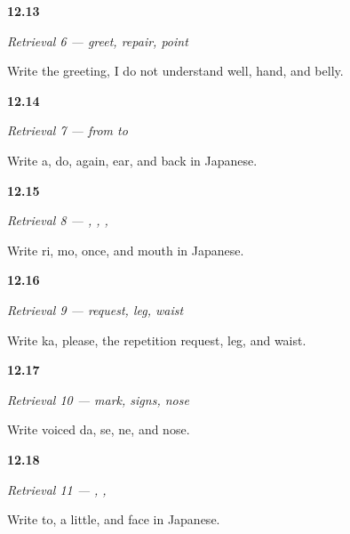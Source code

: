 \noindent\begin{minipage}[t]{\linewidth}
\raggedright
\hypertarget{review-JA-R12-repair-01-card}{\textbf{12.13}} \emph{Retrieval 6 — greet, repair, point}\par
\small Write the greeting, I do not understand well, hand, and belly.
\end{minipage}\par\medskip

\noindent\begin{minipage}[t]{\linewidth}
\raggedright
\hypertarget{review-JA-R12-repair-02-card}{\textbf{12.14}} \emph{Retrieval 7 — from  to }\par
\small Write a, do, again, ear, and back in Japanese.
\end{minipage}\par\medskip

\noindent\begin{minipage}[t]{\linewidth}
\raggedright
\hypertarget{review-JA-R12-repair-03-card}{\textbf{12.15}} \emph{Retrieval 8 — , , , }\par
\small Write ri, mo, once, and mouth in Japanese.
\end{minipage}\par\medskip

\noindent\begin{minipage}[t]{\linewidth}
\raggedright
\hypertarget{review-JA-R12-repair-04-card}{\textbf{12.16}} \emph{Retrieval 9 — request, leg, waist}\par
\small Write ka, please, the repetition request, leg, and waist.
\end{minipage}\par\medskip

\noindent\begin{minipage}[t]{\linewidth}
\raggedright
\hypertarget{review-JA-R12-writing-01-card}{\textbf{12.17}} \emph{Retrieval 10 — mark, signs, nose}\par
\small Write voiced da, se, ne, and nose.
\end{minipage}\par\medskip

\noindent\begin{minipage}[t]{\linewidth}
\raggedright
\hypertarget{review-JA-R12-writing-02-card}{\textbf{12.18}} \emph{Retrieval 11 — , , }\par
\small Write to, a little, and face in Japanese.
\end{minipage}\par\medskip


